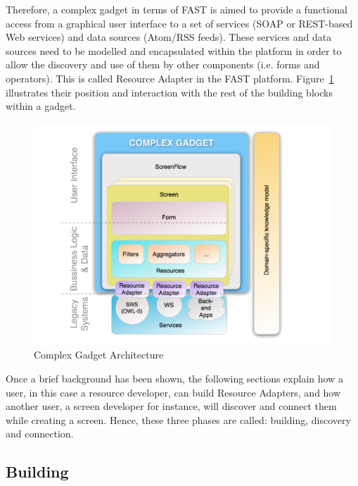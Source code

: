 \documentclass{fast_latex}
\begin{document}
Therefore, a complex gadget in terms of FAST is aimed to provide a functional access from a graphical user interface to a set of services (SOAP or REST-based Web services) and data sources (Atom/RSS feeds). These services and data sources need to be modelled and encapsulated within the platform in order to allow the discovery and use of them by other components (i.e. forms and operators). This is called Resource Adapter in the FAST platform. Figure~\ref{fig:complex_gadget_architecture} illustrates their position and interaction with the rest of the building blocks within a gadget.

\begin{figure}
  \begin{center}
    \includegraphics[width=\linewidth]{images/ComplexGadgetArchitecture.pdf}
    \caption{Complex Gadget Architecture}
    \label{fig:complex_gadget_architecture}
  \end{center}
\end{figure}

Once a brief background has been shown, the following sections explain how a user, in this case a resource developer, can build Resource Adapters, and how another user, a screen developer for instance, will discover and connect them while creating a screen. Hence, these three phases are called: building, discovery and connection.

\subsection{Building} %
\label{sub:building}
\end{document}
